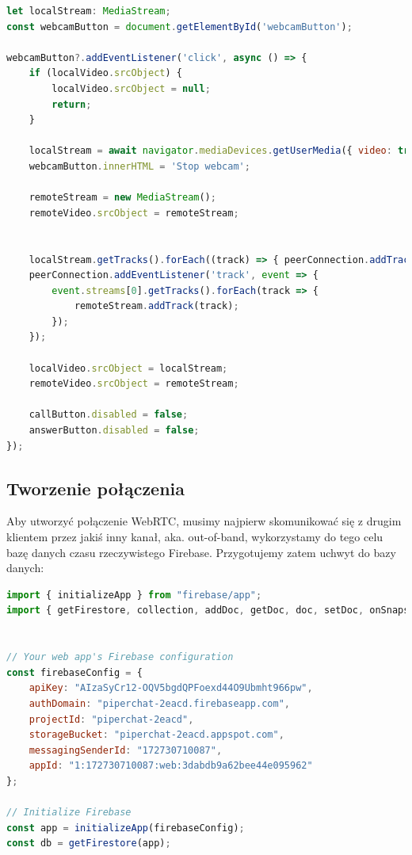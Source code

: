 \begin{lstlisting}[language=Javascript,label=list:media-capture, caption=Przechwytywanie wideo i audio z komputera,
basicstyle=\footnotesize \ttfamily, showtabs=true, tabsize=4]
let localStream: MediaStream;
const webcamButton = document.getElementById('webcamButton');

webcamButton?.addEventListener('click', async () => {
	if (localVideo.srcObject) {
		localVideo.srcObject = null;
		return;
	}

	localStream = await navigator.mediaDevices.getUserMedia({ video: true, audio: true, });
	webcamButton.innerHTML = 'Stop webcam';

	remoteStream = new MediaStream();
	remoteVideo.srcObject = remoteStream;


	localStream.getTracks().forEach((track) => { peerConnection.addTrack(track, localStream); });
	peerConnection.addEventListener('track', event => {
		event.streams[0].getTracks().forEach(track => {
			remoteStream.addTrack(track);
		});
	});

	localVideo.srcObject = localStream;
	remoteVideo.srcObject = remoteStream;

	callButton.disabled = false;
	answerButton.disabled = false;
});

\end{lstlisting}

\subsection{Tworzenie połączenia}

Aby utworzyć połączenie WebRTC, musimy najpierw skomunikować się z drugim klientem przez jakiś inny kanał, aka.
out-of-band, wykorzystamy do tego celu bazę danych czasu rzeczywistego Firebase. Przygotujemy zatem uchwyt do bazy
danych:

\begin{lstlisting}[language=Javascript,label=list:firebase-init, caption=Inicjalizacja Firebase,
basicstyle=\footnotesize \ttfamily, showtabs=true, tabsize=4]
import { initializeApp } from "firebase/app";
import { getFirestore, collection, addDoc, getDoc, doc, setDoc, onSnapshot, updateDoc } from "firebase/firestore";


// Your web app's Firebase configuration
const firebaseConfig = {
	apiKey: "AIzaSyCr12-OQV5bgdQPFoexd44O9Ubmht966pw",
	authDomain: "piperchat-2eacd.firebaseapp.com",
	projectId: "piperchat-2eacd",
	storageBucket: "piperchat-2eacd.appspot.com",
	messagingSenderId: "172730710087",
	appId: "1:172730710087:web:3dabdb9a62bee44e095962"
};

// Initialize Firebase
const app = initializeApp(firebaseConfig);
const db = getFirestore(app);
\end{lstlisting}

